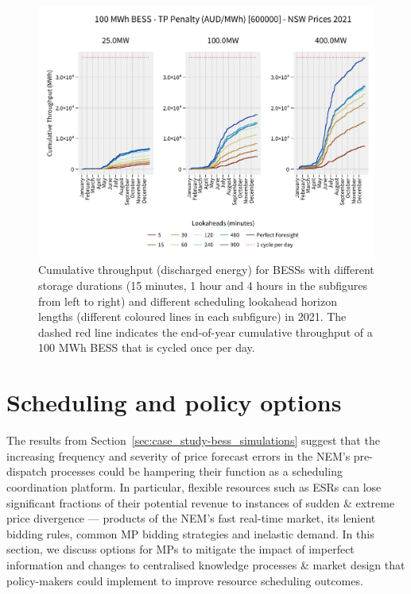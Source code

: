 \documentclass[12pt,a4paper,]{report}
\begin{document}
\begin{figure}
\hypertarget{fig:bess_throughputs}{%
\centering
\includegraphics{source/figures/NSW_100_arbitrage_throughputpenalty_no_degradation_600000_throughputs.pdf}
\caption{Cumulative throughput (discharged energy) for BESSs with
different storage durations (15 minutes, 1 hour and 4 hours in the
subfigures from left to right) and different scheduling lookahead
horizon lengths (different coloured lines in each subfigure) in 2021.
The dashed red line indicates the end-of-year cumulative throughput of a
100 MWh BESS that is cycled once per day.}\label{fig:bess_throughputs}
}
\end{figure}

\hypertarget{sec:info-discussion}{%
\section{Scheduling and policy options}\label{sec:info-discussion}}

The results from Section~\ref{sec:case_study-bess_simulations} suggest
that the increasing frequency and severity of price forecast errors in
the NEM's pre-dispatch processes could be hampering their function as a
scheduling coordination platform. In particular, flexible resources such
as ESRs can lose significant fractions of their potential revenue to
instances of sudden \& extreme price divergence --- products of the
NEM's fast real-time market, its lenient bidding rules, common MP
bidding strategies and inelastic demand. In this section, we discuss
options for MPs to mitigate the impact of imperfect information and
changes to centralised knowledge processes \& market design that
policy-makers could implement to improve resource scheduling outcomes.
\end{document}

